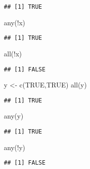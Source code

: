 \documentclass[
]{article}
\newenvironment{Shaded}{\begin{snugshade}}{\end{snugshade}}
\newcommand{\ConstantTok}[1]{\textcolor[rgb]{0.00,0.00,0.00}{#1}}
\newcommand{\FunctionTok}[1]{\textcolor[rgb]{0.00,0.00,0.00}{#1}}
\newcommand{\NormalTok}[1]{#1}
\newcommand{\OtherTok}[1]{\textcolor[rgb]{0.56,0.35,0.01}{#1}}
\newcommand{\SpecialCharTok}[1]{\textcolor[rgb]{0.00,0.00,0.00}{#1}}
\begin{document}
\begin{verbatim}
## [1] TRUE
\end{verbatim}

\begin{Shaded}
\begin{Highlighting}[]
\FunctionTok{any}\NormalTok{(}\SpecialCharTok{!}\NormalTok{x)}
\end{Highlighting}
\end{Shaded}

\begin{verbatim}
## [1] TRUE
\end{verbatim}

\begin{Shaded}
\begin{Highlighting}[]
\FunctionTok{all}\NormalTok{(}\SpecialCharTok{!}\NormalTok{x)}
\end{Highlighting}
\end{Shaded}

\begin{verbatim}
## [1] FALSE
\end{verbatim}

\begin{Shaded}
\begin{Highlighting}[]
\NormalTok{y }\OtherTok{\textless{}{-}} \FunctionTok{c}\NormalTok{(}\ConstantTok{TRUE}\NormalTok{,}\ConstantTok{TRUE}\NormalTok{)}
\FunctionTok{all}\NormalTok{(y)}
\end{Highlighting}
\end{Shaded}

\begin{verbatim}
## [1] TRUE
\end{verbatim}

\begin{Shaded}
\begin{Highlighting}[]
\FunctionTok{any}\NormalTok{(y)}
\end{Highlighting}
\end{Shaded}

\begin{verbatim}
## [1] TRUE
\end{verbatim}

\begin{Shaded}
\begin{Highlighting}[]
\FunctionTok{any}\NormalTok{(}\SpecialCharTok{!}\NormalTok{y)}
\end{Highlighting}
\end{Shaded}

\begin{verbatim}
## [1] FALSE
\end{verbatim}
\end{document}
